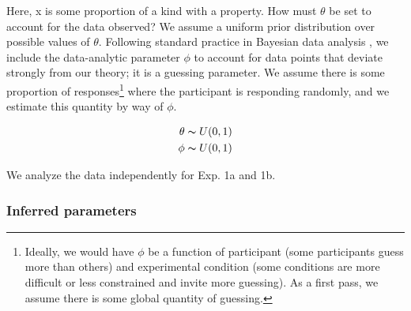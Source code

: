 \documentclass[10pt,letterpaper]{article}
\newcommand{\red}[1]{\textcolor{Red}{#1}}
\begin{document}
Here, x is some proportion of a kind with a property. How must $\theta$ be set to account for the data observed? We assume a uniform prior distribution over possible values of $\theta$. Following standard practice in Bayesian data analysis \cite{LW2014}, we include the data-analytic parameter $\phi$ to account for data points that deviate strongly from our theory; it is a guessing parameter. We assume there is some proportion of responses\footnote{Ideally, we would have $\phi$ be a function of participant (some participants guess more than others) and experimental condition (some conditions are more difficult or less constrained and invite more guessing). As a first pass, we assume there is some global quantity of guessing.} where the participant is responding randomly, and we estimate this quantity by way of $\phi$.

\begin{align}
\theta \thicksim U(0,1) \\
\phi \thicksim U(0,1) %
\end{align}

%

%
%	
%		
%			

We analyze the data independently for Exp. 1a and 1b.

\subsubsection{Inferred parameters}
\end{document}
